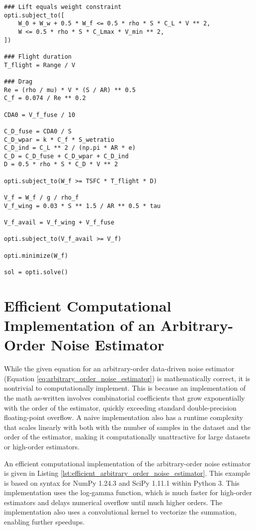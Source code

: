 \begin{verbatim}
### Lift equals weight constraint
opti.subject_to([
    W_0 + W_w + 0.5 * W_f <= 0.5 * rho * S * C_L * V ** 2,
    W <= 0.5 * rho * S * C_Lmax * V_min ** 2,
])

### Flight duration
T_flight = Range / V

### Drag
Re = (rho / mu) * V * (S / AR) ** 0.5
C_f = 0.074 / Re ** 0.2

CDA0 = V_f_fuse / 10

C_D_fuse = CDA0 / S
C_D_wpar = k * C_f * S_wetratio
C_D_ind = C_L ** 2 / (np.pi * AR * e)
C_D = C_D_fuse + C_D_wpar + C_D_ind
D = 0.5 * rho * S * C_D * V ** 2

opti.subject_to(W_f >= TSFC * T_flight * D)

V_f = W_f / g / rho_f
V_f_wing = 0.03 * S ** 1.5 / AR ** 0.5 * tau

V_f_avail = V_f_wing + V_f_fuse

opti.subject_to(V_f_avail >= V_f)

opti.minimize(W_f)

sol = opti.solve()
    \end{verbatim}

\newpage
\section{Efficient Computational Implementation of an Arbitrary-Order Noise Estimator}
\label{sec:estimator_code_example}

While the given equation for an arbitrary-order data-driven noise estimator (Equation \ref{eq:arbitrary_order_noise_estimator}) is mathematically correct, it is nontrivial to computationally implement. This is because an implementation of the math as-written involves combinatorial coefficients that grow exponentially with the order of the estimator, quickly exceeding standard double-precision floating-point overflow. A naive implementation also has a runtime complexity that scales linearly with both with the number of samples in the dataset and the order of the estimator, making it computationally unattractive for large datasets or high-order estimators.

An efficient computational implementation of the arbitrary-order noise estimator is given in Listing \ref{lst:efficient_arbitrary_order_noise_estimator}. This example is based on syntax for NumPy 1.24.3 and SciPy 1.11.1 within Python 3. This implementation uses the log-gamma function, which is much faster for high-order estimators and delays numerical overflow until much higher orders. The implementation also uses a convolutional kernel to vectorize the summation, enabling further speedups.

